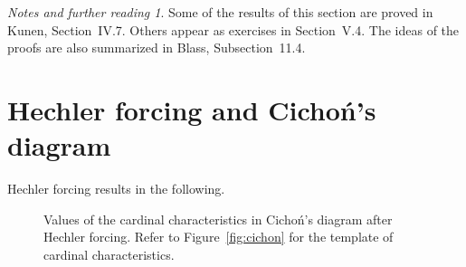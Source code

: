 \documentclass[11pt,oneside]{amsbook}
\theoremstyle{definition}
\theoremstyle{plain}
\theoremstyle{definition}
\theoremstyle{remark}
\newtheorem*{notes}{Notes and further reading}
\numberwithin{equation}{section}
\numberwithin{figure}{section}
\begin{document}
\begin{notes}
  Some of the results of this section are proved in Kunen, Section~IV.7. Others appear as exercises in Section~V.4. The ideas of the proofs are also summarized in Blass, Subsection~11.4.
\end{notes}


\newpage
\section{Hechler forcing and Cicho\'n's diagram}

Hechler forcing results in the following.

\begin{figure}[h]
  \caption{Values of the cardinal characteristics in Cicho\'n's diagram after Hechler forcing. Refer to Figure~\ref{fig:cichon} for the template of cardinal characteristics.\label{fig:cichon-hechler}}
\end{figure}


\end{document}
